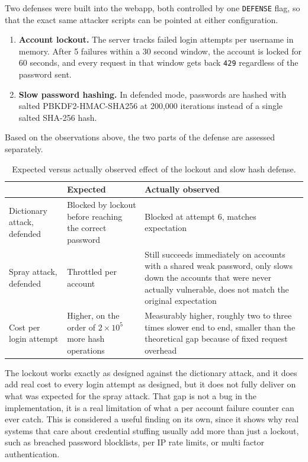\documentclass[11pt]{article}
\begin{document}
Two defenses were built into the webapp, both controlled by one
\texttt{DEFENSE} flag, so that the exact same attacker scripts can be
pointed at either configuration.

\begin{enumerate}[leftmargin=*]
  \item \textbf{Account lockout.} The server tracks failed login attempts
    per username in memory. After 5 failures within a 30 second window, the
    account is locked for 60 seconds, and every request in that window
    gets back \texttt{429} regardless of the password sent.
  \item \textbf{Slow password hashing.} In defended mode, passwords are
    hashed with salted PBKDF2-HMAC-SHA256 at 200{,}000 iterations instead
    of a single salted SHA-256 hash.
\end{enumerate}

Based on the observations above, the two parts of the defense are assessed
separately.

\begin{table}[H]
\centering
\begin{tabularx}{\textwidth}{@{} l X X @{}}
\toprule
\rowcolor{navy!12}
& \textbf{Expected} & \textbf{Actually observed} \\
\midrule
Dictionary attack, defended & Blocked by lockout before reaching the
correct password & Blocked at attempt 6, matches expectation \\
Spray attack, defended & Throttled per account & Still succeeds
immediately on accounts with a shared weak password, only slows down the
accounts that were never actually vulnerable, does not match the original
expectation \\
Cost per login attempt & Higher, on the order of $2 \times 10^5$ more hash
operations & Measurably higher, roughly two to three times slower end to
end, smaller than the theoretical gap because of fixed request overhead \\
\bottomrule
\end{tabularx}
\caption{Expected versus actually observed effect of the lockout and slow
hash defense.}
\end{table}

The lockout works exactly as designed against the dictionary attack, and it
does add real cost to every login attempt as designed, but it does not
fully deliver on what was expected for the spray attack. That gap is not a
bug in the implementation, it is a real limitation of what a per account
failure counter can ever catch. This is considered a useful finding on its
own, since it shows why real systems that care about credential stuffing
usually add more than just a lockout, such as breached password
blocklists, per IP rate limits, or multi factor authentication.
\end{document}
